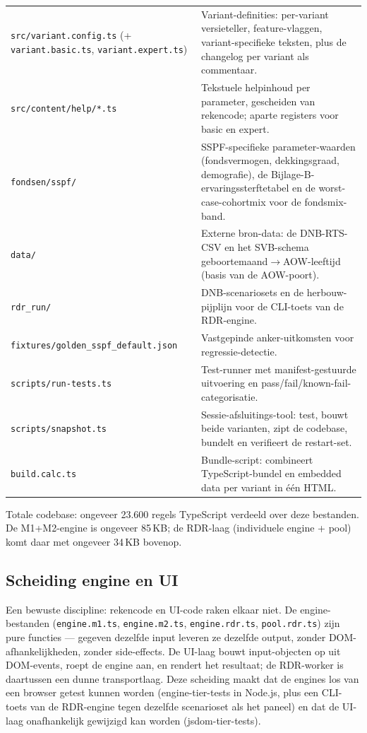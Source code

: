 \documentclass[11pt,a4paper]{article}
\newcommand{\code}[1]{\texttt{#1}}
\begin{document}
\begin{longtable}{@{}>{\raggedright\arraybackslash}p{}>{\raggedright\arraybackslash}p{}@{}}
\code{src/variant.config.ts} (+\,\code{variant.basic.ts}, \code{variant.expert.ts}) & Variant-definities: per-variant versieteller, feature-vlaggen, variant-specifieke teksten, plus de changelog per variant als commentaar. \\
\code{src/content/help/*.ts} & Tekstuele helpinhoud per parameter, gescheiden van rekencode; aparte registers voor basic en expert. \\
\code{fondsen/sspf/} & SSPF-specifieke parameter-waarden (fondsvermogen, dekkingsgraad, demografie), de Bijlage-B-ervaringssterftetabel en de worst-case-cohortmix voor de fondsmix-band. \\
\code{data/} & Externe bron-data: de DNB-RTS-CSV en het SVB-schema geboortemaand$\rightarrow$AOW-leeftijd (basis van de AOW-poort). \\
\code{rdr\_run/} & DNB-scenariosets en de herbouw-pijplijn voor de CLI-toets van de RDR-engine. \\
\code{fixtures/}\allowbreak\code{golden\_sspf\_default.json} & Vastgepinde anker-uitkomsten voor regressie-detectie. \\
\code{scripts/run-tests.ts} & Test-runner met manifest-gestuurde uitvoering en pass/fail/known-fail-categorisatie. \\
\code{scripts/snapshot.ts} & Sessie-afsluitings-tool: test, bouwt beide varianten, zipt de codebase, bundelt en verifieert de restart-set. \\
\code{build.calc.ts} & Bundle-script: combineert TypeScript-bundel en embedded data per variant in \'e\'en HTML. \\
\bottomrule
\end{longtable}

Totale codebase: ongeveer 23.600 regels TypeScript verdeeld over deze bestanden. De M1+M2-engine is ongeveer 85\,KB; de RDR-laag (individuele engine + pool) komt daar met ongeveer 34\,KB bovenop.

\subsection{Scheiding engine en UI}

Een bewuste discipline: rekencode en UI-code raken elkaar niet. De engine-bestanden (\code{engine.m1.ts}, \code{engine.m2.ts}, \code{engine.rdr.ts}, \code{pool.rdr.ts}) zijn pure functies --- gegeven dezelfde input leveren ze dezelfde output, zonder DOM-afhankelijkheden, zonder side-effects. De UI-laag bouwt input-objecten op uit DOM-events, roept de engine aan, en rendert het resultaat; de RDR-worker is daartussen een dunne transportlaag. Deze scheiding maakt dat de engines los van een browser getest kunnen worden (engine-tier-tests in Node.js, plus een CLI-toets van de RDR-engine tegen dezelfde scenarioset als het paneel) en dat de UI-laag onafhankelijk gewijzigd kan worden (jsdom-tier-tests).
\end{document}
